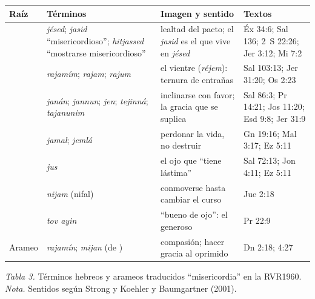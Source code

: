 \begin{center}\small\renewcommand{\arraystretch}{1.2}
\begin{tabular}{@{}L{1.3cm}L{4.6cm}L{4.4cm}L{4.0cm}@{}}
\toprule
\textbf{Raíz} & \textbf{Términos} & \textbf{Imagen y sentido} & \textbf{Textos} \\ \midrule
{} &  \emph{jésed};  \emph{jasid} ``misericordioso'';  \emph{hitjassed} ``mostrarse misericordioso'' & lealtad del pacto; el \emph{jasid} es el que vive en \emph{jésed} & Éx 34:6; Sal 136; 2~S 22:26; Jer 3:12; Mi 7:2 \\
 &  \emph{rajamím};  \emph{rajam};  \emph{rajum} & el vientre (\emph{réjem}): ternura de entrañas & Sal 103:13; Jer 31:20; Os 2:23 \\
 &  \emph{janán};  \emph{jannun};  \emph{jen};  \emph{tejinná};  \emph{tajanunim} & inclinarse con favor; la gracia que se suplica & Sal 86:3; Pr 14:21; Jos 11:20; Esd 9:8; Jer 31:9 \\
 &  \emph{jamal};  \emph{jemlá} & perdonar la vida, no destruir & Gn 19:16; Mal 3:17; Ez 5:11 \\
 &  \emph{jus} & el ojo que ``tiene lástima'' & Sal 72:13; Jon 4:11; Ez 5:11 \\
 &  \emph{nijam} (nifal) & conmoverse hasta cambiar el curso & Jue 2:18 \\
 &  \emph{tov ayin} & ``bueno de ojo'': el generoso & Pr 22:9 \\
Arameo &  \emph{rajamín};  \emph{mijan} (de ) & compasión; hacer gracia al oprimido & Dn 2:18; 4:27 \\
\bottomrule
\end{tabular}\par
{\footnotesize\color{gris}\textit{Tabla 3.} Términos hebreos y arameos traducidos ``misericordia'' en la RVR1960. \textit{Nota.} Sentidos según Strong y Koehler y Baumgartner (2001).}
\end{center}

